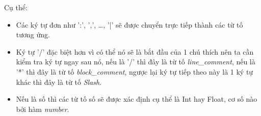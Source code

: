 Cụ thể:
\begin{itemize}
  \item Các ký tự đơn như ':', ',', \dots , '|' sẽ được chuyển trực tiếp thành các từ tố 
  tương ứng.
  \item Ký tự '/' đặc biệt hơn vì có thể nó sẽ là bắt đầu của 1 chú thích nên ta cần kiểm
  tra ký tự ngay sau nó, nếu là '/' thì đây là từ tố \textit{line\_comment}, nếu là '*' 
  thì đây là từ tố \textit{block\_comment}, ngược lại ký tự tiếp theo này là 1 ký tự khác 
  thì đây là từ tố \textit{Slash}.
  \item Nếu là số thì các từ tố số sẽ được xác định cụ thể là Int hay Float, cơ số nào bởi 
  hàm \textit{number}.




\end{itemize}
